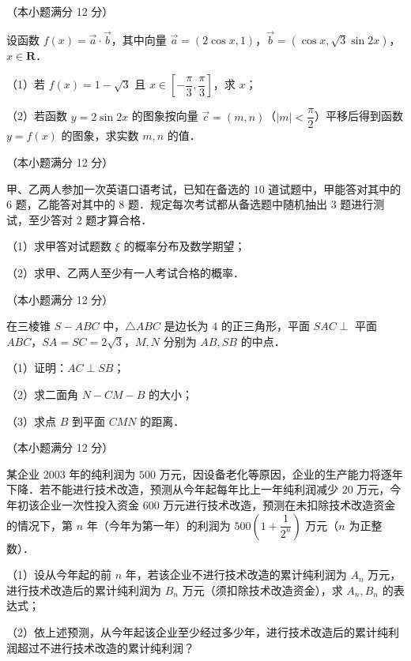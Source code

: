 \begin{question}
（本小题满分 12 分）

设函数 $f(x) = \vec{a} \cdot \vec{b}$，其中向量 $\vec{a} = (2\cos x, 1)$，$\vec{b} = (\cos x, \sqrt{3}\sin 2x)$，$x \in \mathbf{R}$．

（1）若 $f(x) = 1 - \sqrt{3}$ 且 $x \in \left[-\dfrac{\pi}{3}, \dfrac{\pi}{3}\right]$，求 $x$；

（2）若函数 $y = 2\sin 2x$ 的图象按向量 $\vec{c} = (m, n)$（$|m| < \dfrac{\pi}{2}$）平移后得到函数 $y = f(x)$ 的图象，求实数 $m, n$ 的值．

\end{question}
\begin{question}
（本小题满分 12 分）

甲、乙两人参加一次英语口语考试，已知在备选的 $10$ 道试题中，甲能答对其中的 $6$ 题，乙能答对其中的 $8$ 题．规定每次考试都从备选题中随机抽出 $3$ 题进行测试，至少答对 $2$ 题才算合格．

（1）求甲答对试题数 $\xi$ 的概率分布及数学期望；

（2）求甲、乙两人至少有一人考试合格的概率．

\Needspace{0.4\textheight}
\end{question}
\begin{question}
（本小题满分 12 分）

在三棱锥 $S - ABC$ 中，$\triangle ABC$ 是边长为 $4$ 的正三角形，平面 $SAC \perp$ 平面 $ABC$，$SA = SC = 2\sqrt{3}$，$M, N$ 分别为 $AB, SB$ 的中点．

（1）证明：$AC \perp SB$；

（2）求二面角 $N - CM - B$ 的大小；

（3）求点 $B$ 到平面 $CMN$ 的距离．
\nopagebreak[4]
\begin{center}\end{center}
\nopagebreak[4]
\end{question}
\begin{question}
（本小题满分 12 分）

某企业 2003 年的纯利润为 $500$ 万元，因设备老化等原因，企业的生产能力将逐年下降．若不能进行技术改造，预测从今年起每年比上一年纯利润减少 $20$ 万元，今年初该企业一次性投入资金 $600$ 万元进行技术改造，预测在未扣除技术改造资金的情况下，第 $n$ 年（今年为第一年）的利润为 $500\left(1 + \dfrac{1}{2^n}\right)$ 万元（$n$ 为正整数）．

（1）设从今年起的前 $n$ 年，若该企业不进行技术改造的累计纯利润为 $A_n$ 万元，进行技术改造后的累计纯利润为 $B_n$ 万元（须扣除技术改造资金），求 $A_n, B_n$ 的表达式；

（2）依上述预测，从今年起该企业至少经过多少年，进行技术改造后的累计纯利润超过不进行技术改造的累计纯利润？

\end{question}

